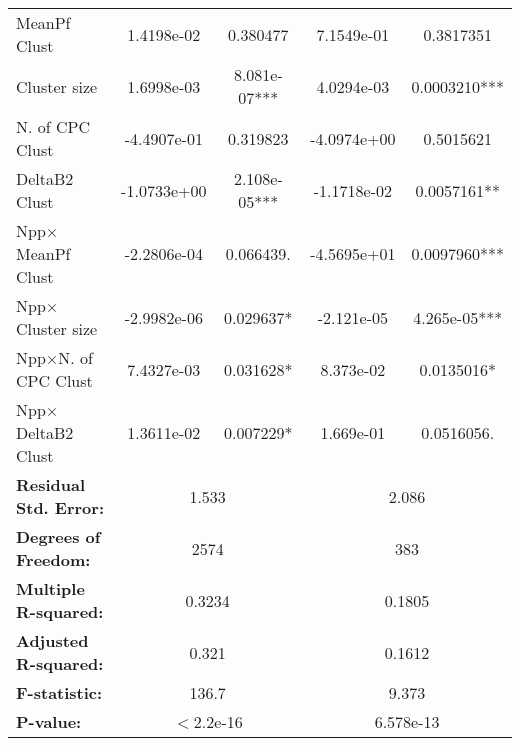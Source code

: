 \documentclass{article}
\begin{document}
\begin{table}[h!]
\begin{tabular}{lcccc}
MeanPf Clust            & 1.4198e-02 & 0.380477   & 7.1549e-01 & 0.3817351 \\
Cluster size                 & 1.6998e-03 & 8.081e-07***    & 4.0294e-03 & 0.0003210*** \\
N. of CPC Clust                 & -4.4907e-01 & 0.319823    & -4.0974e+00 & 0.5015621 \\
DeltaB2 Clust                 & -1.0733e+00 & 2.108e-05***    & -1.1718e-02 & 0.0057161** \\
Npp$\times$MeanPf Clust            & -2.2806e-04 & 0.066439.   & -4.5695e+01 & 0.0097960*** \\
Npp$\times$Cluster size       & -2.9982e-06 & 0.029637*   & -2.121e-05 & 4.265e-05*** \\
Npp$\times$N. of CPC Clust           & 7.4327e-03 & 0.031628* & 8.373e-02 & 0.0135016* \\
Npp$\times$DeltaB2 Clust            & 1.3611e-02 & 0.007229* & 1.669e-01 & 0.0516056. \\
\midrule
\multicolumn{1}{l}{\textbf{Residual Std. Error:}} & \multicolumn{2}{c}{1.533} & \multicolumn{2}{c}{2.086} \\
\multicolumn{1}{l}{\textbf{Degrees of Freedom:}} & \multicolumn{2}{c}{2574} & \multicolumn{2}{c}{383} \\
\multicolumn{1}{l}{\textbf{Multiple R-squared:}} & \multicolumn{2}{c}{0.3234} & \multicolumn{2}{c}{0.1805} \\
\multicolumn{1}{l}{\textbf{Adjusted R-squared:}} & \multicolumn{2}{c}{0.321} & \multicolumn{2}{c}{0.1612} \\
\multicolumn{1}{l}{\textbf{F-statistic:}} & \multicolumn{2}{c}{136.7} & \multicolumn{2}{c}{9.373} \\
\multicolumn{1}{l}{\textbf{P-value:}} & \multicolumn{2}{c}{$<$2.2e-16} & \multicolumn{2}{c}{6.578e-13} \\
\bottomrule
\end{tabular}
\end{table}
\end{document}
